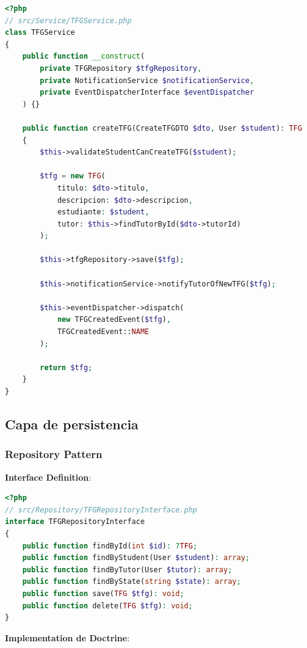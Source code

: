 \documentclass[12pt,a4paper,oneside]{report}
\begin{document}
\begin{lstlisting}[language=PHP]
<?php
// src/Service/TFGService.php
class TFGService
{
    public function __construct(
        private TFGRepository $tfgRepository,
        private NotificationService $notificationService,
        private EventDispatcherInterface $eventDispatcher
    ) {}
    
    public function createTFG(CreateTFGDTO $dto, User $student): TFG
    {
        $this->validateStudentCanCreateTFG($student);
        
        $tfg = new TFG(
            titulo: $dto->titulo,
            descripcion: $dto->descripcion,
            estudiante: $student,
            tutor: $this->findTutorById($dto->tutorId)
        );
        
        $this->tfgRepository->save($tfg);
        
        $this->notificationService->notifyTutorOfNewTFG($tfg);
        
        $this->eventDispatcher->dispatch(
            new TFGCreatedEvent($tfg),
            TFGCreatedEvent::NAME
        );
        
        return $tfg;
    }
}
\end{lstlisting}

\subsection{Capa de persistencia}\label{capa-de-persistencia}

\subsubsection{Repository Pattern}\label{repository-pattern}

\textbf{Interface Definition}:

\begin{lstlisting}[language=PHP]
<?php
// src/Repository/TFGRepositoryInterface.php
interface TFGRepositoryInterface
{
    public function findById(int $id): ?TFG;
    public function findByStudent(User $student): array;
    public function findByTutor(User $tutor): array;
    public function findByState(string $state): array;
    public function save(TFG $tfg): void;
    public function delete(TFG $tfg): void;
}
\end{lstlisting}

\textbf{Implementation de Doctrine}:
\end{document}
